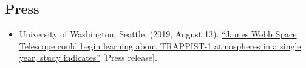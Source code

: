 \documentclass[margin,10pt]{res}
\begin{document}
\begin{resume}
\section{Press}
                \begin{itemize}  
                    \item University of Washington, Seattle. (2019, August 13). \href{https://www.washington.edu/news/2019/08/13/james-webb-space-telescope-could-begin-learning-about-trappist-1-atmospheres-in-a-single-year-study-indicates/}{``James Webb Space Telescope could begin learning about TRAPPIST-1 atmospheres in a single year, study indicates''} [Press release]. 
                 \end{itemize}

\end{resume}
\end{document}
